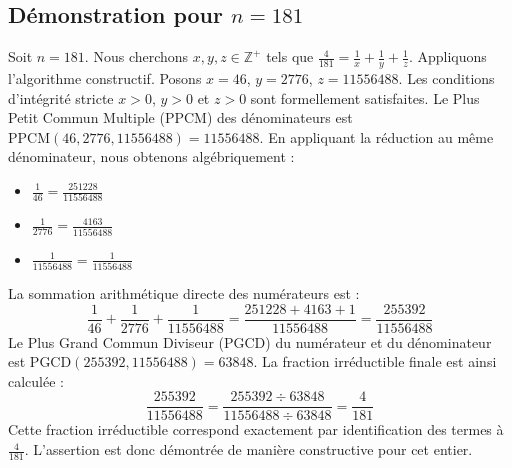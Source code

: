 \documentclass[11pt,a4paper]{article}
\begin{document}
\subsection{Démonstration pour $n = 181$}
Soit $n = 181$. Nous cherchons $x, y, z \in \mathbb{Z}^{+}$ tels que $\frac{4}{181} = \frac{1}{x} + \frac{1}{y} + \frac{1}{z}$.
Appliquons l'algorithme constructif. Posons $x = 46$, $y = 2776$, $z = 11556488$.
Les conditions d'intégrité stricte $x > 0$, $y > 0$ et $z > 0$ sont formellement satisfaites.
Le Plus Petit Commun Multiple (PPCM) des dénominateurs est $\text{PPCM}(46, 2776, 11556488) = 11556488$.
En appliquant la réduction au même dénominateur, nous obtenons algébriquement :
\begin{itemize}
    \item $\frac{1}{46} = \frac{251228}{11556488}$
    \item $\frac{1}{2776} = \frac{4163}{11556488}$
    \item $\frac{1}{11556488} = \frac{1}{11556488}$
\end{itemize}
La sommation arithmétique directe des numérateurs est :
$$ \frac{1}{46} + \frac{1}{2776} + \frac{1}{11556488} = \frac{251228 + 4163 + 1}{11556488} = \frac{255392}{11556488} $$
Le Plus Grand Commun Diviseur (PGCD) du numérateur et du dénominateur est $\text{PGCD}(255392, 11556488) = 63848$.
La fraction irréductible finale est ainsi calculée :
$$ \frac{255392}{11556488} = \frac{255392 \div 63848}{11556488 \div 63848} = \frac{4}{181} $$
Cette fraction irréductible correspond exactement par identification des termes à $\frac{4}{181}$. L'assertion est donc démontrée de manière constructive pour cet entier.
\end{document}
